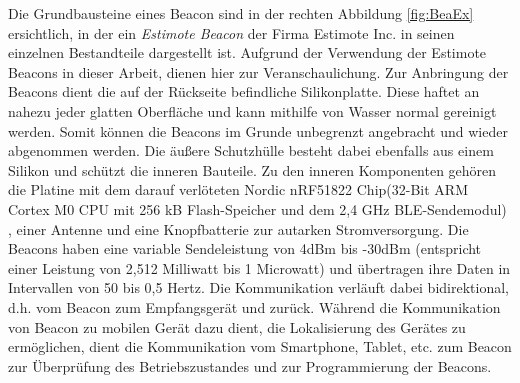 Die Grundbausteine eines Beacon sind in der rechten Abbildung \ref{fig:BeaEx} ersichtlich, in der ein \textit{Estimote Beacon} der Firma Estimote Inc. in seinen einzelnen Bestandteile dargestellt ist. Aufgrund der Verwendung der Estimote Beacons in dieser Arbeit, dienen hier zur Veranschaulichung. Zur Anbringung der Beacons dient die auf der Rückseite befindliche Silikonplatte. Diese haftet an nahezu jeder glatten Oberfläche und kann mithilfe von Wasser normal gereinigt werden. Somit können die Beacons im Grunde unbegrenzt angebracht und wieder abgenommen werden. Die äußere Schutzhülle besteht dabei ebenfalls aus einem Silikon und schützt die inneren Bauteile. Zu den inneren Komponenten gehören die Platine mit dem darauf verlöteten Nordic nRF51822 Chip(32-Bit ARM Cortex M0 CPU mit 256 kB Flash-Speicher und dem 2,4 GHz BLE-Sendemodul) \cite{nRF5}, einer Antenne und eine Knopfbatterie zur autarken Stromversorgung. Die Beacons haben eine variable Sendeleistung von 4dBm bis -30dBm (entspricht einer Leistung von 2,512 Milliwatt bis 1 Microwatt) und übertragen ihre Daten in Intervallen von 50 bis 0,5 Hertz. Die Kommunikation verläuft dabei bidirektional, d.h. vom Beacon zum Empfangsgerät und zurück. Während die Kommunikation von Beacon zu mobilen Gerät dazu dient, die Lokalisierung des Gerätes zu ermöglichen, dient die Kommunikation vom Smartphone, Tablet, etc. zum Beacon zur Überprüfung des Betriebszustandes und zur Programmierung der Beacons. \\ \\
